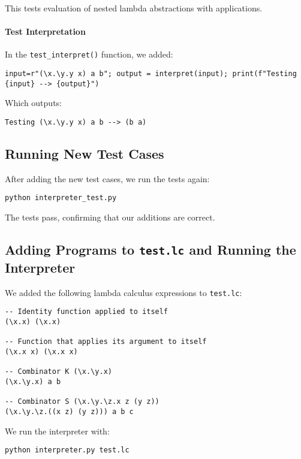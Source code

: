 \documentclass{article}
\theoremstyle{theorem}
\theoremstyle{definition}
\theoremstyle{remark}
\begin{document}
This tests evaluation of nested lambda abstractions with applications.

\paragraph{Test Interpretation}

In the \texttt{test\_interpret()} function, we added:

\begin{verbatim}
input=r"(\x.\y.y x) a b"; output = interpret(input); print(f"Testing {input} --> {output}")
\end{verbatim}

Which outputs:

\begin{verbatim}
Testing (\x.\y.y x) a b --> (b a)
\end{verbatim}

\subsection{Running New Test Cases}

After adding the new test cases, we run the tests again:

\begin{verbatim}
python interpreter_test.py
\end{verbatim}

The tests pass, confirming that our additions are correct.

\subsection{Adding Programs to \texttt{test.lc} and Running the Interpreter}

\label{sec:testlc}

We added the following lambda calculus expressions to \texttt{test.lc}:

\begin{verbatim}
-- Identity function applied to itself
(\x.x) (\x.x)

-- Function that applies its argument to itself
(\x.x x) (\x.x x)

-- Combinator K (\x.\y.x)
(\x.\y.x) a b

-- Combinator S (\x.\y.\z.x z (y z))
(\x.\y.\z.((x z) (y z))) a b c
\end{verbatim}

We run the interpreter with:

\begin{verbatim}
python interpreter.py test.lc
\end{verbatim}
\end{document}
